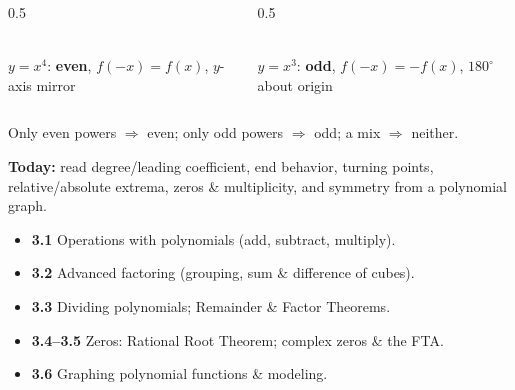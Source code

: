 \documentclass[aspectratio=169, 11pt]{beamer}
\newcommand{\lgrid}[4]{%
  \draw[step=1, linegray!45, thin] (#1,#3) grid (#2,#4);
  \draw[->, thick, charcoal] (#1,0)--(#2,0) node[below right, font=\tiny]{$x$};
  \draw[->, thick, charcoal] (0,#3)--(0,#4) node[left, font=\tiny]{$y$};}
\begin{document}
\begin{frame}[t, plain]
  \begin{columns}[T]
    \begin{column}{0.5\textwidth}
      \centering
      \\
      {\footnotesize $y=x^4$: \textbf{even}, $f(-x)=f(x)$, $y$-axis mirror}
    \end{column}
    \begin{column}{0.5\textwidth}
      \centering
      \\
      {\footnotesize $y=x^3$: \textbf{odd}, $f(-x)=-f(x)$, $180^\circ$ about origin}
    \end{column}
  \end{columns}
  \vspace{3pt}
  \begin{center}\footnotesize Only even powers $\Rightarrow$ even; only odd powers $\Rightarrow$ odd; a mix $\Rightarrow$ neither.\end{center}
\end{frame}

\begin{frame}[t, plain]
  \textbf{Today:} read degree/leading coefficient, end behavior, turning points, relative/absolute
  extrema, zeros \& multiplicity, and symmetry from a polynomial graph.\\[8pt]
  \begin{itemize}\setlength{\itemsep}{3pt}
    \item \textbf{3.1} Operations with polynomials (add, subtract, multiply).
    \item \textbf{3.2} Advanced factoring (grouping, sum \& difference of cubes).
    \item \textbf{3.3} Dividing polynomials; Remainder \& Factor Theorems.
    \item \textbf{3.4--3.5} Zeros: Rational Root Theorem; complex zeros \& the FTA.
    \item \textbf{3.6} Graphing polynomial functions \& modeling.
  \end{itemize}
\end{frame}
\end{document}
